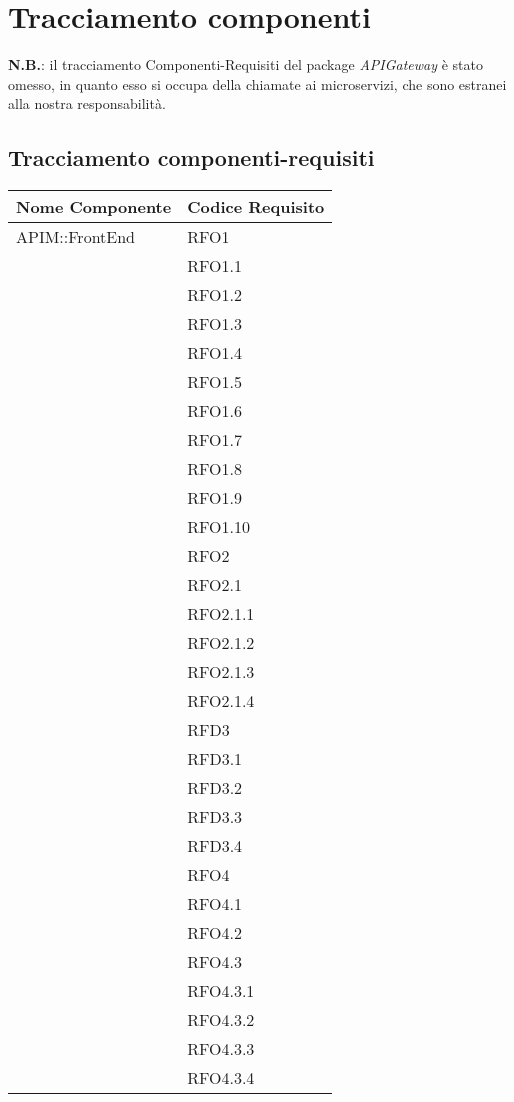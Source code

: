 \newpage
\renewcommand*{\arraystretch}{1.6}

\section{Tracciamento componenti}
\textbf{N.B.}: il tracciamento Componenti-Requisiti del package \textit{APIGateway} è stato omesso, in quanto esso si occupa della chiamate ai microservizi, che sono estranei alla nostra responsabilità.

\subsection{Tracciamento componenti-requisiti}
		\begin{longtable}{ p{12cm} | p{4cm} }
			\hline \rowcolor{Gray}
			\textbf{Nome Componente} & \textbf{Codice Requisito} \\
			\hline
			APIM::FrontEnd
			& RFO1 \\
			& RFO1.1 \\
			& RFO1.2 \\
			& RFO1.3 \\
			& RFO1.4 \\
			& RFO1.5 \\
			& RFO1.6 \\
			& RFO1.7 \\
			& RFO1.8 \\
			& RFO1.9 \\
			& RFO1.10 \\
			& RFO2 \\
			& RFO2.1 \\
			& RFO2.1.1 \\
			& RFO2.1.2 \\
			& RFO2.1.3 \\
			& RFO2.1.4 \\
			& RFD3 \\
			& RFD3.1 \\
			& RFD3.2 \\
			& RFD3.3 \\
			& RFD3.4 \\
			& RFO4 \\
			& RFO4.1 \\
			& RFO4.2 \\
			& RFO4.3 \\
			& RFO4.3.1 \\
			& RFO4.3.2 \\
			& RFO4.3.3 \\
			& RFO4.3.4 \\

\end{longtable}
